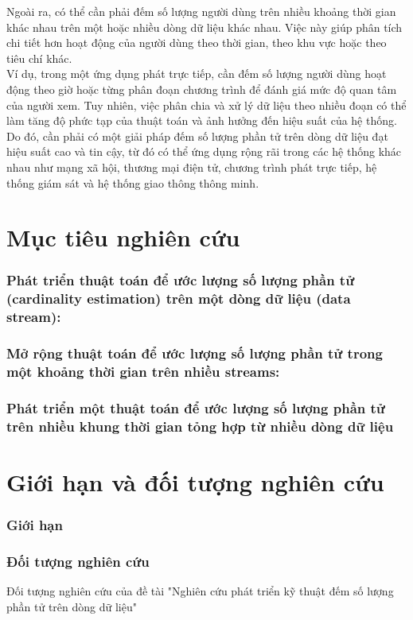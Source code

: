 \documentclass[a4paper,13pt]{article}
\theoremstyle{mytheor}
\begin{document}
Ngoài ra, có thể cần phải đếm số lượng người dùng trên nhiều khoảng thời gian khác nhau trên một hoặc nhiều dòng dữ liệu khác nhau. 
Việc này giúp phân tích chi tiết hơn hoạt động của người dùng theo thời gian, theo khu vực hoặc theo tiêu chí khác.\\
Ví dụ, trong một ứng dụng phát trực tiếp, cần đếm số lượng người dùng hoạt động theo giờ hoặc từng phân đoạn chương trình 
để đánh giá mức độ quan tâm của người xem. Tuy nhiên, việc phân chia và xử lý dữ liệu theo nhiều đoạn có thể làm 
tăng độ phức tạp của thuật toán và ảnh hưởng đến hiệu suất của hệ thống. Do đó, cần phải có một giải pháp 
đếm số lượng phần tử trên dòng dữ liệu đạt hiệu suất cao và tin cậy, từ đó có thể ứng dụng rộng rãi trong các 
hệ thống khác nhau như mạng xã hội, thương mại điện tử, chương trình phát trực tiếp, hệ thống giám sát 
và hệ thống giao thông thông minh.

\section{Mục tiêu nghiên cứu}
\subsubsection{Phát triển thuật toán để ước lượng số lượng phần tử (cardinality estimation) trên một dòng dữ liệu (data stream):}
\subsubsection{Mở rộng thuật toán để ước lượng số lượng phần tử trong một khoảng thời gian trên nhiều streams:}
\subsubsection{Phát triển một thuật toán để ước lượng số lượng phần tử trên nhiều khung thời gian tỏng hợp từ nhiều dòng dữ liệu}

\section{Giới hạn và đối tượng nghiên cứu }
\subsubsection{Giới hạn}
\subsubsection{Đối tượng nghiên cứu }
Đối tượng nghiên cứu của đề tài "Nghiên cứu phát triển kỹ thuật đếm số lượng phần tử trên dòng dữ liệu"
\end{document}
